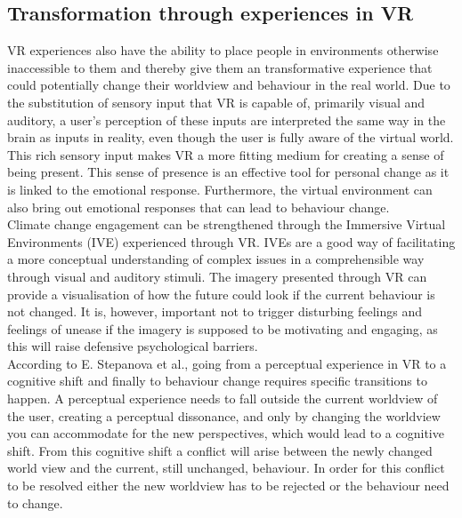    \subsection{Transformation through experiences in VR}
    VR experiences also have the ability to place people in environments otherwise inaccessible to them\cite{vrCapabilitiesSlater, emotiveImagery} and thereby give them an transformative experience that could potentially change their worldview and behaviour in the real world\cite{transformativeVR, riva2016transforming}. Due to the substitution of sensory input that VR is capable of, primarily visual and auditory, a user's perception of these inputs are interpreted the same way in the brain as inputs in reality, even though the user is fully aware of the virtual world\cite{vrCapabilitiesSlater}. This rich sensory input makes VR a more fitting medium for creating a sense of being present\cite{ahn2011embodied}. This sense of presence is an effective tool for personal change as it is linked to the emotional response\cite{riva2016transforming, vrEngagementClimateChange}. Furthermore, the virtual environment can also bring out emotional responses that can lead to behaviour change\cite{transformativeVR, ahn2011embodied}.\\
    
    Climate change engagement can be strengthened through the Immersive Virtual Environments (IVE) experienced through VR\cite{vrEngagementClimateChange}. IVEs are a good way of facilitating a more conceptual understanding of complex issues in a comprehensible way through visual and auditory stimuli. The imagery presented through VR can provide a visualisation of how the future could look if the current behaviour is not changed\cite{emotiveImagery}. It is, however, important not to trigger disturbing feelings and feelings of unease if the imagery is supposed to be motivating and engaging, as this will raise defensive psychological barriers\cite{emotiveImagery}.\\
    
    According to E. Stepanova et al., going from a perceptual experience in VR to a cognitive shift and finally to behaviour change requires specific transitions to happen\cite{transformativeVR}. A perceptual experience needs to fall outside the current worldview of the user, creating a perceptual dissonance, and only by changing the worldview you can accommodate for the new perspectives, which would lead to a cognitive shift. From this cognitive shift a conflict will arise between the newly changed world view and the current, still unchanged, behaviour. In order for this conflict to be resolved either the new worldview has to be rejected or the behaviour need to change\cite{transformativeVR}.\\
    
